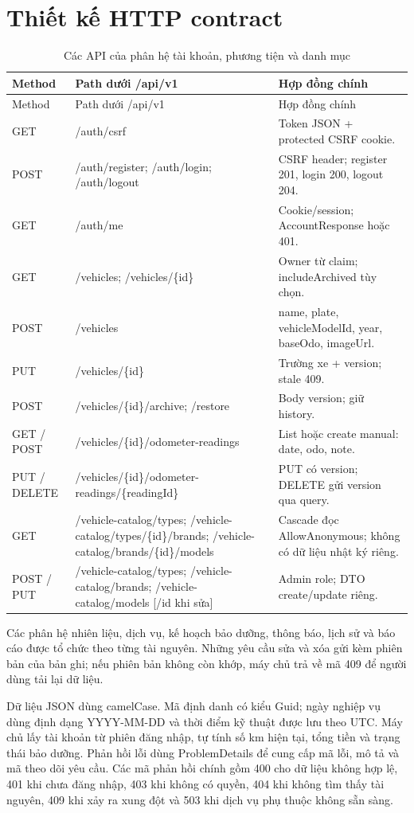 \section{Thiết kế HTTP contract}
\begin{smalltable}\begin{longtable}{L{1.6cm}L{7.5cm}L{5.7cm}}
\caption{Các API của phân hệ tài khoản, phương tiện và danh mục}\label{tab:api-current}\\\toprule Method & Path dưới /api/v1 & Hợp đồng chính\\\midrule\endfirsthead
\toprule Method & Path dưới /api/v1 & Hợp đồng chính\\\midrule\endhead
GET & /auth/csrf & Token JSON + protected CSRF cookie.\\
POST & /auth/register; /auth/login; /auth/logout & CSRF header; register 201, login 200, logout 204.\\
GET & /auth/me & Cookie/session; AccountResponse hoặc 401.\\
GET & /vehicles; /vehicles/\{id\} & Owner từ claim; includeArchived tùy chọn.\\
POST & /vehicles & name, plate, vehicleModelId, year, baseOdo, imageUrl.\\
PUT & /vehicles/\{id\} & Trường xe + version; stale 409.\\
POST & /vehicles/\{id\}/archive; /restore & Body version; giữ history.\\
GET / POST & /vehicles/\{id\}/odometer-readings & List hoặc create manual: date, odo, note.\\
PUT / DELETE & /vehicles/\{id\}/odometer-readings/\{readingId\} & PUT có version; DELETE gửi version qua query.\\
GET & /vehicle-catalog/types; /vehicle-catalog/types/\{id\}/brands; /vehicle-catalog/brands/\{id\}/models & Cascade đọc AllowAnonymous; không có dữ liệu nhật ký riêng.\\
POST / PUT & /vehicle-catalog/types; /vehicle-catalog/brands; /vehicle-catalog/models [/{id} khi sửa] & Admin role; DTO create/update riêng.\\\bottomrule
\end{longtable}\end{smalltable}

Các phân hệ nhiên liệu, dịch vụ, kế hoạch bảo dưỡng, thông báo, lịch sử và báo cáo được tổ chức theo từng tài nguyên. Những yêu cầu sửa và xóa gửi kèm phiên bản của bản ghi; nếu phiên bản không còn khớp, máy chủ trả về mã 409 để người dùng tải lại dữ liệu.

Dữ liệu JSON dùng camelCase. Mã định danh có kiểu Guid; ngày nghiệp vụ dùng định dạng YYYY-MM-DD và thời điểm kỹ thuật được lưu theo UTC. Máy chủ lấy tài khoản từ phiên đăng nhập, tự tính số km hiện tại, tổng tiền và trạng thái bảo dưỡng. Phản hồi lỗi dùng ProblemDetails để cung cấp mã lỗi, mô tả và mã theo dõi yêu cầu. Các mã phản hồi chính gồm 400 cho dữ liệu không hợp lệ, 401 khi chưa đăng nhập, 403 khi không có quyền, 404 khi không tìm thấy tài nguyên, 409 khi xảy ra xung đột và 503 khi dịch vụ phụ thuộc không sẵn sàng.
